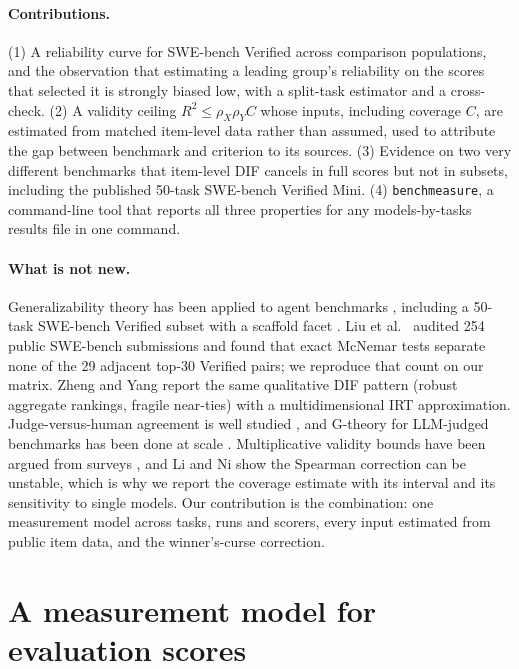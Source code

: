 \documentclass[11pt]{article}
\begin{document}
\paragraph{Contributions.} (1) A reliability curve for SWE-bench Verified across comparison populations, and the observation that estimating a leading group's reliability on the scores that selected it is strongly biased low, with a split-task estimator and a cross-check. (2) A validity ceiling $R^2 \le \rho_X \rho_Y C$ whose inputs, including coverage $C$, are estimated from matched item-level data rather than assumed, used to attribute the gap between benchmark and criterion to its sources. (3) Evidence on two very different benchmarks that item-level DIF cancels in full scores but not in subsets, including the published 50-task SWE-bench Verified Mini. (4) \texttt{benchmeasure}, a command-line tool that reports all three properties for any models-by-tasks results file in one command.

\paragraph{What is not new.} Generalizability theory has been applied to agent benchmarks \citep{srinivasan2026ddr,hardy2026agentreliability}, including a 50-task SWE-bench Verified subset with a scaffold facet \citep{hardy2026agentreliability}. Liu et al.\ \citep{liu2026converged} audited 254 public SWE-bench submissions and found that exact McNemar tests separate none of the 29 adjacent top-30 Verified pairs; we reproduce that count on our matrix. Zheng and Yang \citep{zheng2026familydif} report the same qualitative DIF pattern (robust aggregate rankings, fragile near-ties) with a multidimensional IRT approximation. Judge-versus-human agreement is well studied \citep{zheng2023judging,thakur2025judging,bavaresco2024judgebench}, and G-theory for LLM-judged benchmarks has been done at scale \citep{anand2026askwhich}. Multiplicative validity bounds have been argued from surveys \citep{caban2026measurement}, and Li and Ni \citep{li2026measuredorreal} show the Spearman correction can be unstable, which is why we report the coverage estimate with its interval and its sensitivity to single models. Our contribution is the combination: one measurement model across tasks, runs and scorers, every input estimated from public item data, and the winner's-curse correction.

\section{A measurement model for evaluation scores}
\label{sec:model}
\end{document}
